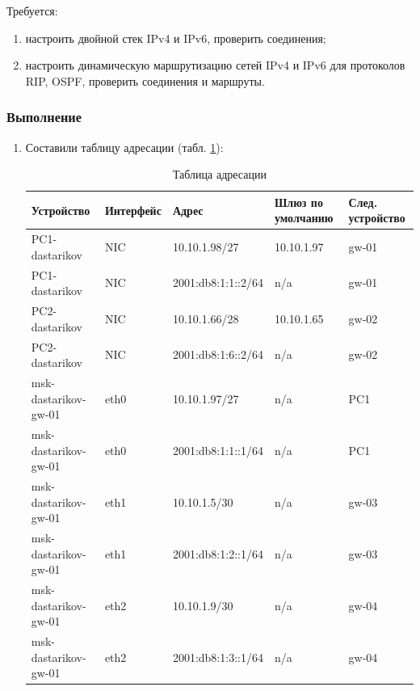   Требуется:
  \begin{enumerate}
  \item настроить двойной стек IPv4 и IPv6, проверить соединения;
  \item настроить динамическую маршрутизацию сетей IPv4 и IPv6 для протоколов RIP, OSPF, проверить соединения и маршруты.
  \end{enumerate}

  \subsubsection{Выполнение}
  \begin{enumerate}
  \item Составили таблицу адресации (табл. \ref{tab4}):
    \begin{table}[]
      \centering
      \caption{Таблица адресации}
      \label{tab4}
      \begin{tabular}{|l|l|l|l|l|}
        \hline
        Устройство           & Интерфейс & Адрес              & Шлюз по умолчанию & След. устройство \\ \hline
        PC1-dastarikov       & NIC       & 10.10.1.98/27      & 10.10.1.97        & gw-01                \\ 
        PC1-dastarikov       & NIC       & 2001:db8:1:1::2/64 & n/a               & gw-01                \\ \hline
        PC2-dastarikov       & NIC       & 10.10.1.66/28      & 10.10.1.65        & gw-02                \\ 
        PC2-dastarikov       & NIC       & 2001:db8:1:6::2/64 & n/a               & gw-02                \\ \hline
        msk-dastarikov-gw-01 & eth0      & 10.10.1.97/27      & n/a               & PC1                  \\ 
        msk-dastarikov-gw-01 & eth0      & 2001:db8:1:1::1/64 & n/a               & PC1                  \\ 
        msk-dastarikov-gw-01 & eth1      & 10.10.1.5/30       & n/a               & gw-03                \\ 
        msk-dastarikov-gw-01 & eth1      & 2001:db8:1:2::1/64 & n/a               & gw-03                \\ 
        msk-dastarikov-gw-01 & eth2      & 10.10.1.9/30       & n/a               & gw-04                \\ 
        msk-dastarikov-gw-01 & eth2      & 2001:db8:1:3::1/64 & n/a               & gw-04                \\ \hline

\end{tabular}
\end{table}
\end{enumerate}
